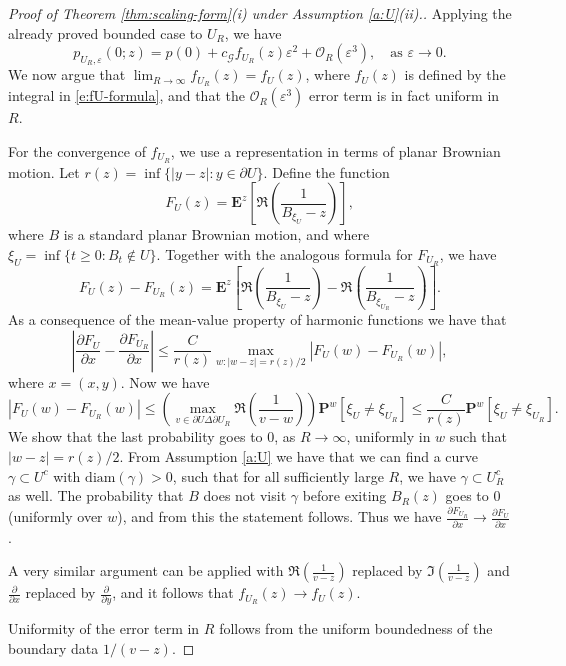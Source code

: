 \documentclass[11pt]{article}
\theoremstyle{remark}
\def\eps{\varepsilon}
\def\E{\mathbf{E}}
\def\cG{\mathcal{G}}
\newcommand{\eqn}[2]{\begin{equation}\label{#1}#2\end{equation}}
\begin{document}
\begin{proof}[Proof of Theorem \ref{thm:scaling-form}(i) under Assumption \ref{a:U}(ii).]
Applying the already proved bounded case to $U_R$, we have
\eqn{e:bounded-asymp-formula}
{ p_{U_R,\eps}(0;z)
  = p(0) + c_\cG f_{U_R}(z) \eps^2 + \mathcal{O}_R(\eps^3), \quad \text{as $\eps \to 0$.} }
We now argue that $\lim_{R \to \infty} f_{U_R}(z) = f_U(z)$, where $f_U(z)$ is
defined by the integral in \eqref{e:fU-formula}, and that the $\mathcal{O}_R(\eps^3)$
error term is in fact uniform in $R$. 

For the convergence of $f_{U_R}$, we use a representation in terms of planar Brownian motion. 
Let $r(z) = \inf \{ |y - z| : y \in \partial U \}$. Define
the function
\[ F_U(z) 
   = \E^z \left[ \Re\left(\frac{1}{B_{\xi_{U}}-z}\right) \right], \]
where $B$ is a standard planar Brownian motion, and where
$\xi_U = \inf \{ t \ge 0 : B_t \not\in U \}$. Together with the analogous formula 
for $F_{U_R}$, we have 
\[ F_U(z) - F_{U_R}(z)
   = \E^z \left[ \Re\left(\frac{1}{B_{\xi_{U}}-z}\right) 
     - \Re\left(\frac{1}{B_{\xi_{U_R}}-z}\right) \right]. \]
As a consequence of the mean-value property of harmonic 
functions \cite[Theorem 2.2.7]{Evans-book} we have that
\[ \left| \frac{\partial F_U}{\partial x} - \frac{\partial F_{U_R}}{\partial x} \right| 
   \le \frac{C}{r(z)} \max_{w : |w - z| = r(z)/2} |F_U(w) - F_{U_R}(w)|, \]
where $x = (x,y)$. Now we have 
\[ |F_U(w) - F_{U_R}(w)|
   \le \left( \max_{v \in \partial U \Delta \partial U_R} \Re\left(\frac{1}{v-w}\right) \right) 
       \mathbf{P}^w \left[ \xi_U \not= \xi_{U_R} \right] 
   \le \frac{C}{r(z)} \mathbf{P}^w \left[ \xi_U \not= \xi_{U_R} \right]. \]
We show that the last probability goes to $0$, as $R \to \infty$, uniformly in
$w$ such that $|w - z| = r(z)/2$. From Assumption \ref{a:U} we have that
we can find a curve $\gamma \subset U^c$ with $\mathrm{diam}(\gamma) > 0$, 
such that for all sufficiently large $R$, we have $\gamma \subset U_R^c$ as well. 
The probability that $B$ does not visit $\gamma$ before exiting $B_R(z)$ goes to $0$ 
(uniformly over $w$), and from this the statement follows. Thus we have 
$\frac{\partial F_{U_R}}{\partial x} \to \frac{\partial F_{U}}{\partial x}$.

A very similar argument can be applied with $\Re\left(\frac{1}{v-z}\right)$ replaced by
$\Im\left(\frac{1}{v-z}\right)$ and $\frac{\partial}{\partial x}$ replaced by 
$\frac{\partial}{\partial y}$, and it follows that $f_{U_R}(z) \to f_U(z)$.

Uniformity of the error term in $R$ follows from the uniform boundedness of the boundary data $1/(v-z)$.
\end{proof}
\end{document}
